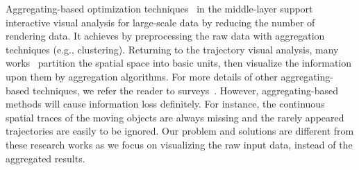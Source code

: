 {Aggregating-based optimization techniques~\cite{zeng2013visualizing,von2015mobilitygraphs} in the middle-layer support interactive visual analysis for large-scale data by
	reducing the number of rendering data.}
It achieves by preprocessing the raw data with aggregation techniques (e.g., clustering).
Returning to the trajectory visual analysis,
many works~\cite{wood2010visualisation,guo2009flow,von2015mobilitygraphs} partition the {spatial space} into basic units,
then visualize the information upon them by aggregation algorithms.
For more details of other aggregating-based techniques, we refer the reader to surveys~\cite{andrienko2008spatio}.
However, aggregating-based methods will cause information loss definitely.
For instance, the continuous spatial traces of the moving objects are always missing and the rarely appeared trajectories are easily to be ignored.
Our problem and solutions are different from these research works as we focus on visualizing the raw input data, instead of the aggregated results.



